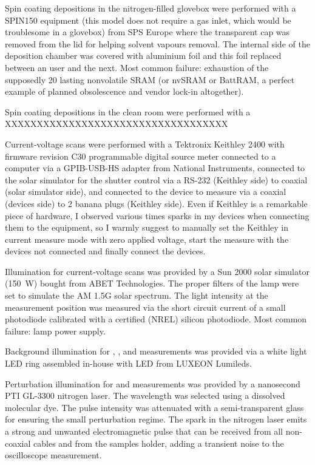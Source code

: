 	Spin coating depositions in the nitrogen-filled glovebox were performed with a SPIN150 equipment (this model does not require a gas inlet, which would be troublesome in a glovebox) from SPS Europe where the transparent cap was removed from the lid for helping solvent vapours removal. The internal side of the deposition chamber was covered with aluminium foil and this foil replaced between an user and the next. Most common failure: exhaustion of the supposedly \SI{20}{\year} lasting nonvolatile SRAM (or nvSRAM or BattRAM, a perfect example of planned obsolescence and vendor lock-in altogether).
	
	Spin coating depositions in the clean room were performed with a XXXXXXXXXXXXXXXXXXXXXXXXXXXXXXXXXXX
	
	Current-voltage scans were performed with a Tektronix Keithley 2400 with firmware revision C30 programmable digital source meter connected to a computer via a GPIB-USB-HS adapter from National Instruments, connected to the solar simulator for the shutter control via a RS-232 (Keithley side) to coaxial (solar simulator side), and connected to the device to measure via a coaxial (devices side) to 2 banana plugs (Keithley side). Even if Keithley is a remarkable piece of hardware, I observed various times sparks in my devices when connecting them to the equipment, so I warmly suggest to manually set the Keithley in current measure mode with zero applied voltage, start the measure with the devices not connected and finally connect the devices.
	
	Illumination for current-voltage scans was provided by a Sun 2000 solar simulator (\SI{150}{\W}) bought from ABET Technologies. The proper filters of the lamp were set to simulate the AM 1.5G solar spectrum. The light intensity at the measurement position was measured via the short circuit current of a small photodiode calibrated with a certified (NREL) silicon photodiode. Most common failure: lamp power supply.
	
	Background illumination for , , and  measurements was provided via a white light LED ring assembled in-house with LED from LUXEON Lumileds.
	
	Perturbation illumination for  and  measurements was provided by a nanosecond PTI GL-3300 nitrogen laser. The wavelength was selected using a dissolved molecular dye. The pulse intensity was attenuated with a semi-transparent glass for ensuring the small perturbation regime. The spark in the nitrogen laser emits a strong and unwanted electromagnetic pulse that can be received from all non-coaxial cables and from the samples holder, adding a transient noise to the oscilloscope measurement.
	
